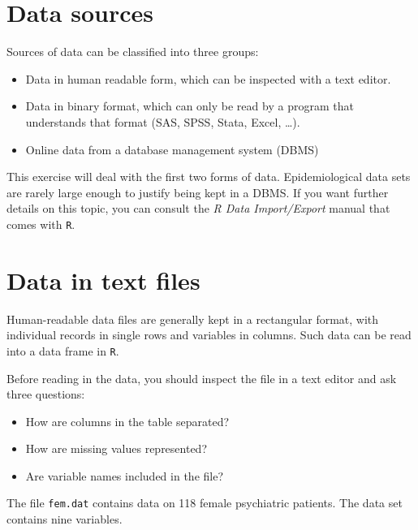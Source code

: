 \documentclass[
]{book}
\providecommand{\tightlist}{%
  \setlength{\itemsep}{0pt}\setlength{\parskip}{0pt}}
\theoremstyle{definition}
\theoremstyle{definition}
\theoremstyle{definition}
\theoremstyle{definition}
\theoremstyle{remark}
\begin{document}
\section{Data sources}\label{data-sources}

Sources of data can be classified into three groups:

\begin{itemize}
\tightlist
\item
  Data in human readable form, which can be inspected with a text editor.
\item
  Data in binary format, which can only be read by a program that
  understands that format (SAS, SPSS, Stata, Excel, \ldots).
\item
  Online data from a database management system (DBMS)
\end{itemize}

This exercise will deal with the first two forms of
data. Epidemiological data sets are rarely large enough to justify
being kept in a DBMS. If you want further details on this topic, you
can consult the \emph{R Data Import/Export} manual that comes with
\texttt{R}.

\section{Data in text files}\label{data-in-text-files}

Human-readable data files are generally kept in a rectangular format,
with individual records in single rows and variables in columns. Such
data can be read into a data frame in \texttt{R}.

Before reading in the data, you should inspect the file in a text
editor and ask three questions:

\begin{itemize}
\tightlist
\item
  How are columns in the table separated?
\item
  How are missing values represented?
\item
  Are variable names included in the file?
\end{itemize}

The file \texttt{fem.dat} contains data on 118 female psychiatric
patients. The data set contains nine variables.
\end{document}
